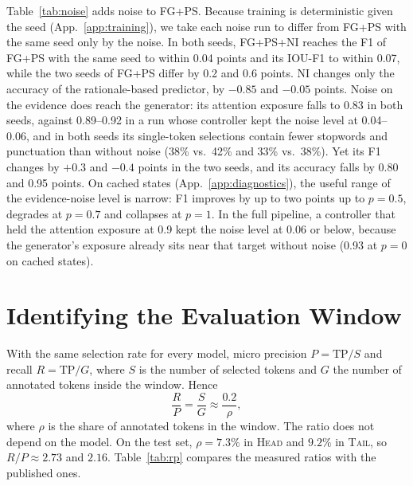 \documentclass[11pt]{article}
\newcommand{\HEAD}{\textup{\textsc{Head}}}
\newcommand{\TAIL}{\textup{\textsc{Tail}}}
\begin{document}
Table~\ref{tab:noise} adds noise to FG+PS. Because training is deterministic given the seed (App.~\ref{app:training}), we take each noise run to differ from FG+PS with the same seed only by the noise. In both seeds, FG+PS+NI reaches the F1 of FG+PS with the same seed to within 0.04 points and its IOU-F1 to within 0.07, while the two seeds of FG+PS differ by 0.2 and 0.6 points. NI changes only the accuracy of the rationale-based predictor, by $-0.85$ and $-0.05$ points. Noise on the evidence does reach the generator: its attention exposure falls to 0.83 in both seeds, against 0.89--0.92 in a run whose controller kept the noise level at 0.04--0.06, and in both seeds its single-token selections contain fewer stopwords and punctuation than without noise (38\% vs.\ 42\% and 33\% vs.\ 38\%). Yet its F1 changes by $+0.3$ and $-0.4$ points in the two seeds, and its accuracy falls by 0.80 and 0.95 points. On cached states (App.~\ref{app:diagnostics}), the useful range of the evidence-noise level is narrow: F1 improves by up to two points up to $p = 0.5$, degrades at $p = 0.7$ and collapses at $p = 1$. In the full pipeline, a controller that held the attention exposure at 0.9 kept the noise level at 0.06 or below, because the generator's exposure already sits near that target without noise (0.93 at $p = 0$ on cached states).

\section{Identifying the Evaluation Window}
\label{app:window}

With the same selection rate for every model, micro precision $P = \mathrm{TP}/S$ and recall $R = \mathrm{TP}/G$, where $S$ is the number of selected tokens and $G$ the number of annotated tokens inside the window. Hence
\begin{equation}
  \frac{R}{P} = \frac{S}{G} \approx \frac{0.2}{\rho},
\end{equation}
where $\rho$ is the share of annotated tokens in the window. The ratio does not depend on the model. On the test set, $\rho = 7.3\%$ in \HEAD{} and $9.2\%$ in \TAIL, so $R/P \approx 2.73$ and $2.16$. Table~\ref{tab:rp} compares the measured ratios with the published ones.
\end{document}
